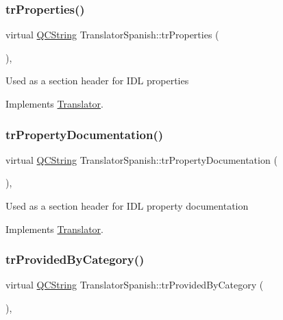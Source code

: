 \subsubsection{\texorpdfstring{trProperties()}{trProperties()}}
{\footnotesize\ttfamily virtual \mbox{\hyperlink{class_q_c_string}{Q\+C\+String}} Translator\+Spanish\+::tr\+Properties (\begin{DoxyParamCaption}{ }\end{DoxyParamCaption})\hspace{0.3cm}{\ttfamily [inline]}, {\ttfamily [virtual]}}

Used as a section header for I\+DL properties 

Implements \mbox{\hyperlink{class_translator}{Translator}}.

\mbox{\label{class_translator_spanish_a8ad1a76b72d78fd64e21365e95a3d579}} 
\subsubsection{\texorpdfstring{trPropertyDocumentation()}{trPropertyDocumentation()}}
{\footnotesize\ttfamily virtual \mbox{\hyperlink{class_q_c_string}{Q\+C\+String}} Translator\+Spanish\+::tr\+Property\+Documentation (\begin{DoxyParamCaption}{ }\end{DoxyParamCaption})\hspace{0.3cm}{\ttfamily [inline]}, {\ttfamily [virtual]}}

Used as a section header for I\+DL property documentation 

Implements \mbox{\hyperlink{class_translator}{Translator}}.

\mbox{\label{class_translator_spanish_ad0a9731e7757f8a10b2cf2e435cdd85e}} 
\subsubsection{\texorpdfstring{trProvidedByCategory()}{trProvidedByCategory()}}
{\footnotesize\ttfamily virtual \mbox{\hyperlink{class_q_c_string}{Q\+C\+String}} Translator\+Spanish\+::tr\+Provided\+By\+Category (\begin{DoxyParamCaption}{ }\end{DoxyParamCaption})\hspace{0.3cm}{\ttfamily [inline]}, {\ttfamily [virtual]}}

